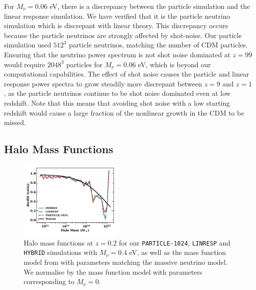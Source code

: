 \documentclass[useAMS, usenatbib]{mnras}
\begin{document}
For $M_\nu = 0.06$ eV, there is a discrepancy between the particle simulation and the linear response simulation. We have verified that it is the particle neutrino simulation which is discrepant with linear theory. This discrepancy occurs because the particle neutrinos are strongly affected by shot-noise. Our particle simulation used $512^3$ particle neutrinos, matching the number of CDM particles. Ensuring that the neutrino power spectrum is not shot noise dominated at $z=99$ would require $2048^3$ particles for $M_\nu = 0.06$ eV, which is beyond our computational capabilities. The effect of shot noise causes the particle and linear response power spectra to grow steadily more discrepant between $z=9$ and $z=1$, as the particle neutrinos continue to be shot noise dominated even at low redshift. Note that this means that avoiding shot noise with a low starting redshift would cause a large fraction of the nonlinear growth in the CDM to be missed.

\subsection{Halo Mass Functions}
\label{sec:halomass}

\begin{figure}
  \includegraphics[width=0.45\textwidth]{nuplots/hmf-0_8333.pdf}
\caption{Halo mass functions at $z=0.2$ for our \texttt{PARTICLE-1024}, \texttt{LINRESP} and \texttt{HYBRID} simulations with $M_\nu = 0.4$ eV, as well as the mass function model from \protect\cite{Watson_2013} with parameters matching the massive neutrino model. We normalise by the mass function model with parameters corresponding to $M_\nu = 0$.}
  \label{fig:halomass}
\end{figure}
\end{document}
